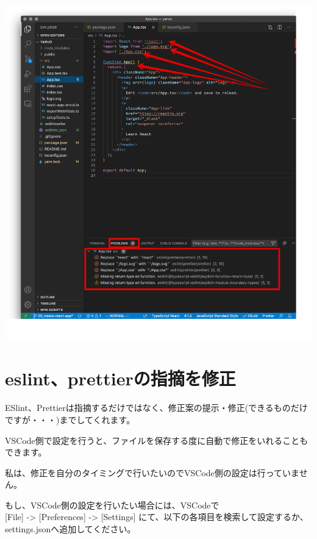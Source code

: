 \begin{reviewimage}[H]%
\includegraphics[width=1.0\maxwidth]{./images/02-create-react-app/03_eslint_prettier.png}%
\label{image:02-create-react-app:03_eslint_prettier}
\end{reviewimage}

\section{eslint、prettierの指摘を修正}
\keeplastskip{
  \label{sec:2-4}
  \label{sec-04fix}
  \par\nobreak
}

ESlint、Prettierは指摘するだけではなく、修正案の提示・修正(できるものだけですが・・・)までしてくれます。

VSCode側で設定を行うと、ファイルを保存する度に自動で修正をいれることもできます。

私は、修正を自分のタイミングで行いたいのでVSCode側の設定は行っていません。

もし、VSCode側の設定を行いたい場合には、VSCodeで\\[0pt]
[File] {-}\textgreater{} [Preferences] {-}\textgreater{} [Settings] にて、以下の各項目を検索して設定するか、settings.jsonへ追加してください。

